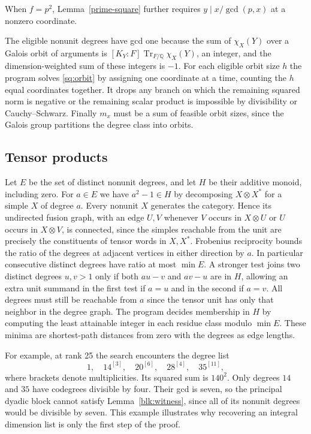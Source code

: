 \documentclass[11pt]{amsart}
\numberwithin{equation}{section}
\begin{document}
When $f=p^2$, Lemma~\ref{prime-square} further requires $y\mid x/\gcd(p,x)$ at a nonzero coordinate.

The eligible nonunit degrees have gcd one because the sum of $\chi_X(Y)$ over a Galois orbit of arguments is $[K_Y:F]\operatorname{Tr}_{F/\mathbb Q}\chi_X(Y)$, an integer, and the dimension-weighted sum of these integers is $-1$. For each eligible orbit size $h$ the program solves \eqref{sq:orbit} by assigning one coordinate at a time, counting the $h$ equal coordinates together. It drops any branch on which the remaining squared norm is negative or the remaining scalar product is impossible by divisibility or Cauchy--Schwarz. Finally $m_x$ must be a sum of feasible orbit sizes, since the Galois group partitions the degree class into orbits.

\subsection{Tensor products}
Let $E$ be the set of distinct nonunit degrees, and let $H$ be their additive monoid, including zero. For $a\in E$ we have $a^2-1\in H$ by decomposing $X\otimes X^*$ for a simple $X$ of degree $a$. Every nonunit $X$ generates the category. Hence its undirected fusion graph, with an edge $U,V$ whenever $V$ occurs in $X\otimes U$ or $U$ occurs in $X\otimes V$, is connected, since the simples reachable from the unit are precisely the constituents of tensor words in $X,X^*$. Frobenius reciprocity bounds the ratio of the degrees at adjacent vertices in either direction by $a$. In particular consecutive distinct degrees have ratio at most $\min E$. A stronger test joins two distinct degrees $u,v>1$ only if both $au-v$ and $av-u$ are in $H$, allowing an extra unit summand in the first test if $a=u$ and in the second if $a=v$. All degrees must still be reachable from $a$ since the tensor unit has only that neighbor in the degree graph. The program decides membership in $H$ by computing the least attainable integer in each residue class modulo $\min E$. These minima are shortest-path distances from zero with the degrees as edge lengths.

For example, at rank 25 the search encounters the degree list
\[
        1,\quad 14^{[3]},\quad20^{[6]},\quad28^{[4]},\quad35^{[11]},
\]
where brackets denote multiplicities. Its squared sum is $140^2$.
Only degrees $14$ and $35$ have codegrees divisible by four.
Their gcd is seven, so the principal dyadic block cannot satisfy Lemma~\ref{blk:witness}, since all of its nonunit degrees would
be divisible by seven. This example illustrates why recovering an
integral dimension list is only the first step of the proof.
\end{document}
